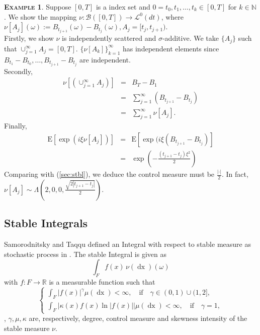 \documentclass[a4paper, twoside, 11pt]{article}
\theoremstyle{definition}
\newtheorem{example}[definition]{\scshape Example}
\newcommand{\brkt}[1]{\left({#1} \right)}
\begin{document}
\begin{example}
  Suppose $[0, T]$ is a index set and $0=t_0, t_1,\dots, t_k \in [0, T]$ for $k\in \mathbb{N}$. We show the mapping $\nu : \mathscr{B}([0, T]) \rightarrow \mathcal{L}^0(dt)$, where $\nu[A_j](\omega):= B_{t_{j+1}}(\omega) - B_{t_{j}}(\omega), A_j=[t_{j}, t_{j+1})$.\\
	Firstly, we show $\nu$ is independently scattered and $\sigma$-additive. We take $\{A_j\}$ such that $\cup_{j=1}^{\infty}A_j = [0, T]$. $\{\nu[A_k]\}_{k=1}^{\infty}$ has independent elements since $B_{t_1} - B_{t_0}, \dots,  B_{t_{j+1}}- B_{t_{j}} $ are independent.\\
	Secondly, 
	\begin{eqnarray*}
	  \nu[\brkt{\cup_{j=1}^{\infty}A_j}] &=& B_T - B_1\\
	  &=& \sum_{j=1}^{\infty} (B_{t_{j+1}} - B_{t_j})\\
	  &=& \sum_{j=1}^{\infty} \nu[A_j].
	\end{eqnarray*}
	Finally, 
	\begin{eqnarray*}
	  \mathrm{E}[\exp(i\xi\nu[A_j])] &=& \mathrm{E}[\exp(i\xi(B_{t_{j+1}} - B_{t_{j}})]\\
	  &=& \exp(-\frac{(t_{j+1}-t_j)\xi^2}{2})
	\end{eqnarray*}
	Comparing with (\ref{sec:stbl}), we deduce the control measure must be $\frac{|\cdot|}{2}$. In fact, $\nu[A_j] \sim \Lambda(2, 0, 0, \frac{\sqrt{2|t_{j+1} - t_j|}}{2})$.
  \label{sec:ex2}
\end{example}

\subsection{Stable Integrals}
Samorodnitsky and Taqqu defined an Integral with respect to stable measure as stochastic process in \cite{samorodnitsky}. The stable Integral is given as 
\begin{equation}
  \int_F f(x)\, \nu(\mathop{dx}) (\omega)
  \label{sec:stbint}
\end{equation}
with $f : F \rightarrow \mathbb{R}$ is a measurable function such that 
\begin{equation}
\begin{cases} \int_F |f(x)|^\gamma \mu(\mathop{dx}) < \infty,\hspace{1em} \text{if} \hspace{1em} \gamma \in (0, 1) \cup (1, 2],\\
	\int_F |\kappa(x) f(x) \ln|f(x)||\mu(\mathop{dx}) < \infty,\hspace{1em} \text{if} \hspace{1em} \gamma = 1,
  \end{cases}
\end{equation}
, $\gamma, \mu, \kappa$ are, respectively, degree, control measure and skewness intensity of the stable measure $\nu$.
\end{document}
